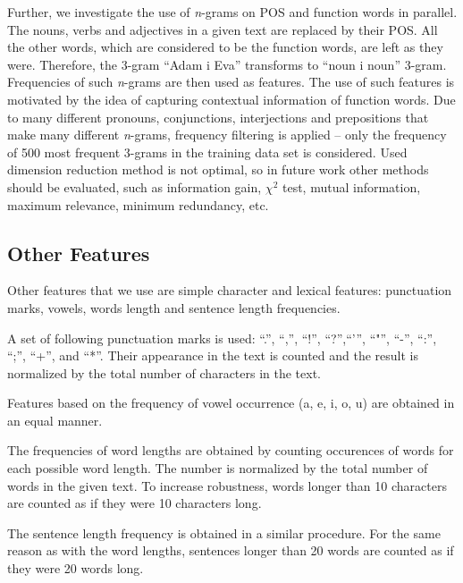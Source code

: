 \documentclass{llncs}
\begin{document}
Further, we investigate the use of \emph{n}-grams on POS and function words in
parallel. The nouns, verbs and adjectives in a given text are replaced by their
POS. All the other words, which are considered to be the function words, are
left as they were. Therefore, the 3-gram ``Adam i Eva'' transforms to ``noun i
noun'' 3-gram. Frequencies of such \emph{n}-grams are then used as features.
The use of such features is motivated by the idea of capturing contextual
information of function words. Due to many different pronouns, conjunctions,
interjections and prepositions that make many different \emph{n}-grams, frequency
filtering is applied -- only the frequency of 500 most frequent 3-grams in the
training data set is considered. Used dimension reduction method is not optimal,
so in future work other methods should be evaluated, such as
information gain, $\chi^2$ test, mutual information, maximum relevance, minimum
redundancy, etc.

\subsection{Other Features}
\label{sec:znacajke-manje}
Other features that we use are simple character and lexical features:
punctuation marks, vowels, words length and sentence length frequencies.

A set of following punctuation marks is used: {``.''}, {``,''}, {``!''}, {``?''},{``{'}''}, {``"''}, {``-''}, {``:''}, {``;''}, {``+''}, and {``*''}. Their appearance in the text is counted and
the result is normalized by the total number of characters in the text. 

Features based on the frequency of vowel occurrence (a, e, i, o, u) are
obtained in an equal manner.


The frequencies of word lengths are obtained by counting occurences of words for each possible word length. The number is normalized by the total number of words in the given text. To increase robustness, words longer than 10 characters are counted as if they were 10 characters long.

The sentence length frequency is obtained in a similar procedure.
For the same reason as with the word lengths, sentences longer than 20 words are
counted as if they were 20 words long.
\end{document}
